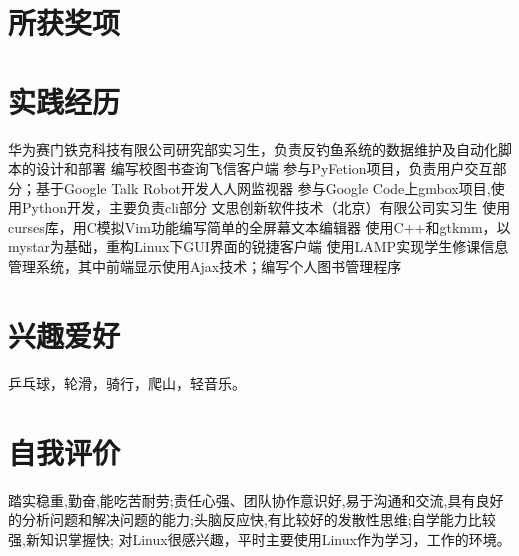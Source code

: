 \documentclass[a4paper]{moderncvwutao}
\begin{document}
\begin{CJK*}{UTF8}{gbsn}
\section{所获奖项}
\section{实践经历}
{ 华为赛门铁克科技有限公司研究部实习生，负责反钓鱼系统的数据维护及自动化脚本的设计和部署}
{ 编写校图书查询飞信客户端}
{ 参与PyFetion项目，负责用户交互部分；基于Google Talk Robot开发人人网监视器}
{ 参与Google Code上gmbox项目,使用Python开发，主要负责cli部分 }
{ 文思创新软件技术（北京）有限公司实习生 }
{ 使用curses库，用C模拟Vim功能编写简单的全屏幕文本编辑器 }
{ 使用C++和gtkmm，以mystar为基础，重构Linux下GUI界面的锐捷客户端 }
{ 使用LAMP实现学生修课信息管理系统，其中前端显示使用Ajax技术；编写个人图书管理程序 }
\section{兴趣爱好}
\cvitem{}
{
\small 乒乓球，轮滑，骑行，爬山，轻音乐。
}
\section{自我评价}
\cvitem{}{}
{

踏实稳重,勤奋,能吃苦耐劳;责任心强、团队协作意识好,易于沟通和交流,具有良好的分析问题和解决问题的能力;头脑反应快,有比较好的发散性思维;自学能力比较强,新知识掌握快;
对Linux很感兴趣，平时主要使用Linux作为学习，工作的环境。
}
\closesection
\end{CJK*}
\end{document}
